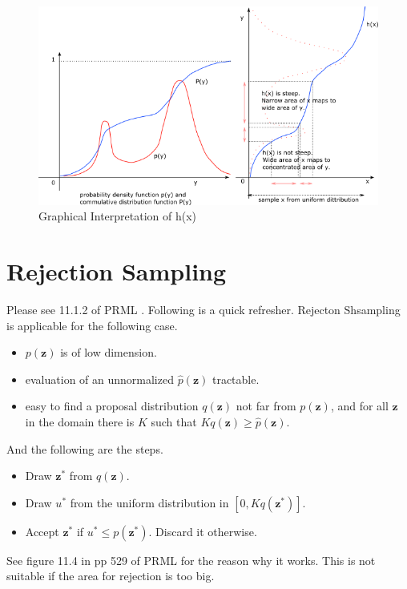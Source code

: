 \documentclass[a4]{article}
\begin{document}
\begin{figure}
\centering
\includegraphics[width=12cm]{basic_sampling.png}
\caption{Graphical Interpretation of h(x)}
\label{fig:basic_sampling}
\end{figure}


\section{Rejection Sampling}
Please see 11.1.2 of PRML \cite{bishop2007}. Following is a quick refresher.
Rejecton Shsampling is applicable for the following case.
\begin{itemize}
\item $p(\bm{z})$ is of low dimension.
\item evaluation of an unnormalized $\hat{p}(\bm{z})$ tractable.
\item easy to find a proposal distribution $q(\bm{z})$ not far from $p(\bm{z})$,
and for all $\bm{z}$ in the domain there is $K$ such that $Kq(\bm{z}) \ge \hat{p}(\bm{z})$.
\end{itemize}

And the following are the steps.
\begin{itemize}
\item Draw $\bm{z}^*$ from $q(\bm{z})$.
\item Draw $u^*$ from the uniform distribution in $[0, Kq(\bm{z}^*)]$.
\item Accept $\bm{z}^*$ if $u^* \le p(\bm{z}^*)$. Discard it otherwise.
\end{itemize}
See figure 11.4 in pp 529 of PRML for the reason why it works.
This is not suitable if the area for rejection is too big.
\end{document}
